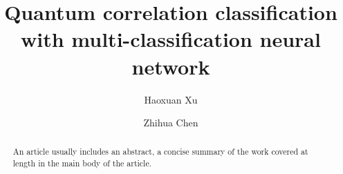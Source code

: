 \documentclass[%
 reprint,
 amsmath,amssymb,
 aps,
]{revtex4-2}
\begin{document}

\title{Quantum correlation classification with multi-classification neural network}%

\author{Haoxuan Xu}
\author{Zhihua Chen}%
%





\begin{abstract}
An article usually includes an abstract, a concise summary of the work
covered at length in the main body of the article. 
\end{abstract}

\maketitle
\end{document}
